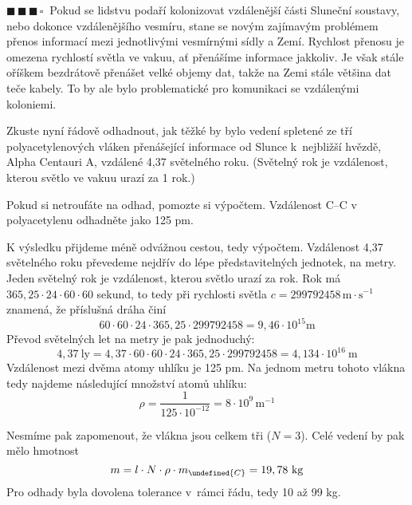 \documentclass{book}
\let\ch\undefined
\newcommand{\tri}{$\blacksquare \, \blacksquare \, \blacksquare \, \square \; \; $}
\renewenvironment{quotation}{\par}{\par} %
\begin{document}
\hrulefill %
\begin{quotation}
\tri Pokud se lidstvu podaří kolonizovat vzdálenější části Sluneční soustavy,
nebo dokonce vzdálenějšího vesmíru, stane se novým zajímavým problémem
přenos informací mezi jednotlivými vesmírnými sídly a Zemí. Rychlost
přenosu je omezena rychlostí světla ve vakuu, ať přenášíme informace
jakkoliv. Je však stále oříškem bezdrátově přenášet velké objemy dat,
takže na Zemi stále většina dat teče kabely. To by ale bylo problematické
pro komunikaci se vzdálenými koloniemi.

Zkuste nyní řádově odhadnout, jak těžké by bylo vedení spletené ze
tří polyacetylenových vláken přenášející informace od Slunce k~nejbližší
hvězdě, Alpha Centauri A, vzdálené 4,37 světelného roku. (Světelný
rok je vzdálenost, kterou světlo ve vakuu urazí za 1 rok.)

Pokud si netroufáte na odhad, pomozte si výpočtem. Vzdálenost C--C
v polyacetylenu odhadněte jako 125 pm.
\end{quotation} \dotfill \par 
K výsledku přijdeme méně odvážnou cestou, tedy výpočtem. Vzdálenost 4,37 světelného
roku převedeme nejdřív do lépe představitelných jednotek, na metry. Jeden světelný rok je vzdálenost, kterou světlo urazí za rok. Rok má $365,25\cdot24\cdot60\cdot60$ sekund, to tedy při rychlosti světla $c=\num{299792458}\, \mathrm{m \cdot s^{-1}}$ znamená, že příslušná dráha činí
\[
60\cdot60\cdot24\cdot365,25\cdot\num{299792458} = 9,46 \cdot 10^{15} \si{\metre}
\]
Převod světelných let na metry je pak jednoduchý:
\[
4,37\mathrm{\ ly}=4,37\cdot60\cdot60\cdot24\cdot365,25\cdot299792458=4,134\cdot10^{16}\ \mathrm{m}
\]
Vzdálenost mezi dvěma atomy uhlíku je 125 pm. Na jednom metru tohoto vlákna tedy najdeme následující množství atomů uhlíku:
\[
\rho=\frac{1}{125\cdot10^{-12}}=8\cdot10^{9}\,\mathrm{m^{-1}}
\]

Nesmíme pak zapomenout, že vlákna jsou celkem tři ($N=3$). Celé vedení
by pak mělo hmotnost 
\[
m=l\cdot N\cdot\rho\cdot m_{\ch{C}}=19,78\mathrm{\ kg}
\]
Pro odhady byla dovolena tolerance v~rámci řádu, tedy 10 až 99 kg.
\end{document}
